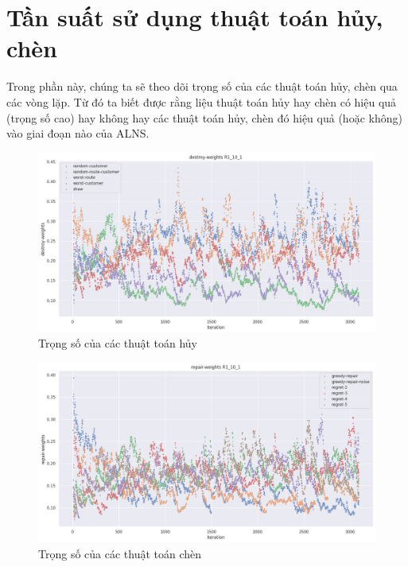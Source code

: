 \section{Tần suất sử dụng thuật toán hủy, chèn}

Trong phần này, chúng ta sẽ theo dõi trọng số của các thuật toán hủy, chèn qua các vòng lặp. Từ đó ta biết được rằng liệu thuật toán hủy hay chèn có hiệu quả (trọng số cao) hay không hay các thuật toán hủy, chèn đó hiệu quả (hoặc không) vào giai đoạn nào của ALNS.
 
\begin{figure}[H] %
	\centering %
	\includegraphics[width=1\textwidth]{figures/destroy_weights_R1_10_1.png}
	\caption{Trọng số của các thuật toán hủy}
	\label{fig:alg_01}
\end{figure}

\begin{figure}[H] %
	\centering %
	\includegraphics[width=1\textwidth]{figures/repair_weights_R1_10_1.png}
	\caption{Trọng số của các thuật toán chèn}
	\label{fig:alg_02}
\end{figure}

